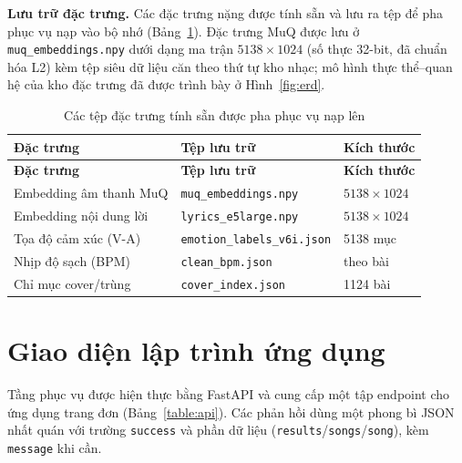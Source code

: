 \documentclass[../DoAn.tex]{subfiles}
\begin{document}
\textbf{Lưu trữ đặc trưng.} Các đặc trưng nặng được tính sẵn và lưu ra tệp để pha phục vụ nạp vào bộ nhớ (Bảng~\ref{table:features}). Đặc trưng MuQ được lưu ở \texttt{muq\_embeddings.npy} dưới dạng ma trận $5138 \times 1024$ (số thực 32-bit, đã chuẩn hóa L2) kèm tệp siêu dữ liệu căn theo thứ tự kho nhạc; mô hình thực thể--quan hệ của kho đặc trưng đã được trình bày ở Hình~\ref{fig:erd}.

\begin{longtable}{|p{4.2cm}|p{5.4cm}|p{2.8cm}|}
\caption{Các tệp đặc trưng tính sẵn được pha phục vụ nạp lên}\label{table:features}\\
\hline
\textbf{Đặc trưng} & \textbf{Tệp lưu trữ} & \textbf{Kích thước} \\
\hline
\endfirsthead
\hline
\textbf{Đặc trưng} & \textbf{Tệp lưu trữ} & \textbf{Kích thước} \\
\hline
\endhead
Embedding âm thanh MuQ & \texttt{muq\_embeddings.npy} & $5138 \times 1024$ \\
\hline
Embedding nội dung lời & \texttt{lyrics\_e5large.npy} & $5138 \times 1024$ \\
\hline
Tọa độ cảm xúc (V-A) & \texttt{emotion\_\allowbreak labels\_\allowbreak v6i.json} & 5138 mục \\
\hline
Nhịp độ sạch (BPM) & \texttt{clean\_bpm.json} & theo bài \\
\hline
Chỉ mục cover/trùng & \texttt{cover\_index.json} & 1124 bài \\
\hline
\end{longtable}

\section{Giao diện lập trình ứng dụng}
\label{section:api}
Tầng phục vụ được hiện thực bằng FastAPI và cung cấp một tập endpoint cho ứng dụng trang đơn (Bảng~\ref{table:api}). Các phản hồi dùng một phong bì JSON nhất quán với trường \texttt{success} và phần dữ liệu (\texttt{results}/\texttt{songs}/\texttt{song}), kèm \texttt{message} khi cần.
\end{document}
